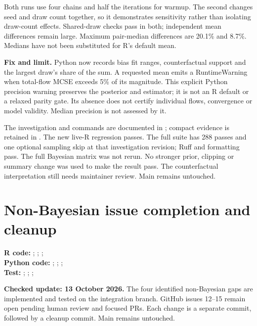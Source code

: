 \documentclass[10pt]{article}
\begin{document}
Both runs use four chains and half the iterations for warmup. The second
changes seed and draw count together, so it demonstrates sensitivity rather
than isolating draw-count effects. Shared-draw checks pass in both; independent
mean differences remain large. Maximum pair-median differences are 20.1\% and
8.7\%. Medians have not been substituted for R's default mean.

\textbf{Fix and limit.} Python now records bias fit ranges, counterfactual
support and the largest draw's share of the sum. A requested mean emits a
RuntimeWarning when total-flow MCSE exceeds 5\% of its magnitude. This explicit
Python precision warning preserves the posterior and estimator; it is not an
R default or a relaxed parity gate. Its absence does not certify individual
flows, convergence or model validity. Median precision is not assessed by it.

The investigation and commands are documented in
; compact evidence is retained
in . The new live-R regression passes.
The full suite has 288 passes and one optional sampling skip at that investigation revision; Ruff and
formatting pass. The full Bayesian matrix was not rerun. No stronger prior,
clipping or summary change was used to make the result pass. The counterfactual
interpretation still needs maintainer review. Main remains untouched.

\clearpage
\section{Non-Bayesian issue completion and cleanup}
{\footnotesize \textbf{R code:} ; ; ; \\ \textbf{Python code:} ; ; ; \\ \textbf{Test:} ; ; ; \par}


\textbf{Checked update: 13 October 2026.} The four identified non-Bayesian gaps
are implemented and tested on the integration branch. GitHub issues 12--15
remain open pending human review and focused PRs. Each change is a separate
commit, followed by a cleanup commit. Main remains untouched.
\end{document}
